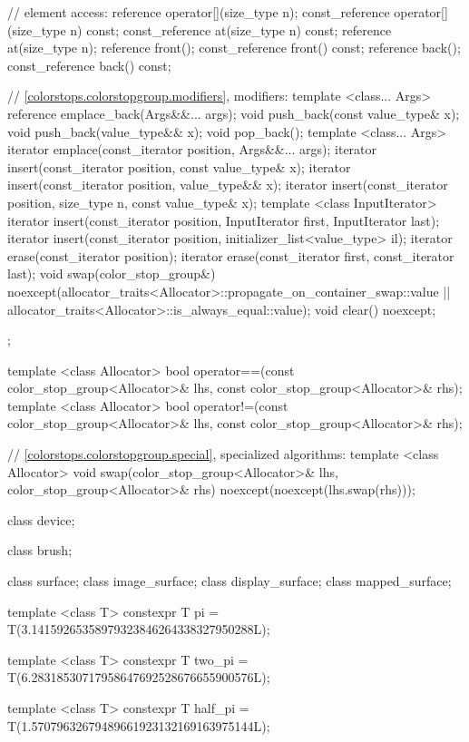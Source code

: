 \begin{codeblock}
{{{{{    // element access:
    reference operator[](size_type n);
    const_reference operator[](size_type n) const;
    const_reference at(size_type n) const;
    reference at(size_type n);
    reference front();
    const_reference front() const;
    reference back();
    const_reference back() const;
    
    // \ref{colorstops.colorstopgroup.modifiers}, modifiers:
    template <class... Args>
    reference emplace_back(Args&&... args);
    void push_back(const value_type& x);
    void push_back(value_type&& x);
    void pop_back();
    template <class... Args>
    iterator emplace(const_iterator position, Args&&... args);
    iterator insert(const_iterator position, const value_type& x);
    iterator insert(const_iterator position, value_type&& x);
    iterator insert(const_iterator position, size_type n, const value_type& x);
    template <class InputIterator>
    iterator insert(const_iterator position, InputIterator first,
      InputIterator last);
    iterator insert(const_iterator position,
    initializer_list<value_type> il);
    iterator erase(const_iterator position);
    iterator erase(const_iterator first, const_iterator last);
    void swap(color_stop_group&)
      noexcept(allocator_traits<Allocator>::propagate_on_container_swap::value 
      || allocator_traits<Allocator>::is_always_equal::value);
    void clear() noexcept;
  };

  template <class Allocator>
  bool operator==(const color_stop_group<Allocator>& lhs, 
    const color_stop_group<Allocator>& rhs);
  template <class Allocator>
  bool operator!=(const color_stop_group<Allocator>& lhs, 
    const color_stop_group<Allocator>& rhs);

  // \ref{colorstops.colorstopgroup.special}, specialized algorithms:
  template <class Allocator>
  void swap(color_stop_group<Allocator>& lhs, color_stop_group<Allocator>& rhs)
    noexcept(noexcept(lhs.swap(rhs)));
  
  class device;

  class brush;
  
  class surface;
  class image_surface;
  class display_surface;
  class mapped_surface;
  
  template <class T>
  constexpr T pi = T(3.14159265358979323846264338327950288L);
  
  template <class T>
  constexpr T two_pi = T(6.28318530717958647692528676655900576L);
  
  template <class T>
  constexpr T half_pi = T(1.57079632679489661923132169163975144L);
  
}}}}
\end{codeblock}
